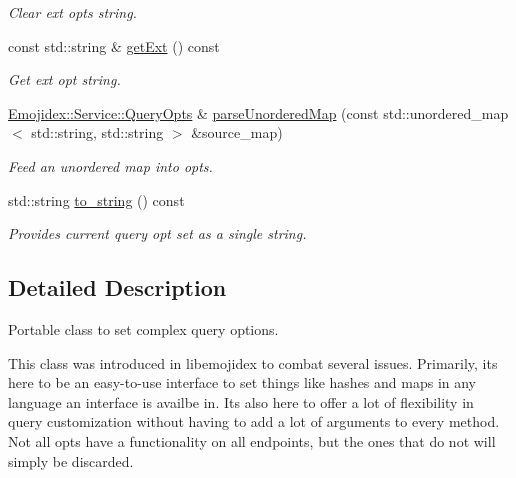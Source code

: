 \begin{DoxyCompactItemize}
\begin{DoxyCompactList}\small\item\em Clear ext opts string. \end{DoxyCompactList}\item 
const std\+::string \& \hyperlink{classEmojidex_1_1Service_1_1QueryOpts_ae1904d52159992a8bc6b50eefe2f27c6}{get\+Ext} () const \hypertarget{classEmojidex_1_1Service_1_1QueryOpts_ae1904d52159992a8bc6b50eefe2f27c6}{}\label{classEmojidex_1_1Service_1_1QueryOpts_ae1904d52159992a8bc6b50eefe2f27c6}

\begin{DoxyCompactList}\small\item\em Get ext opt string. \end{DoxyCompactList}\item 
\hyperlink{classEmojidex_1_1Service_1_1QueryOpts}{Emojidex\+::\+Service\+::\+Query\+Opts} \& \hyperlink{classEmojidex_1_1Service_1_1QueryOpts_afeace74ce515ca48c21c01fae5c01838}{parse\+Unordered\+Map} (const std\+::unordered\+\_\+map$<$ std\+::string, std\+::string $>$ \&source\+\_\+map)\hypertarget{classEmojidex_1_1Service_1_1QueryOpts_afeace74ce515ca48c21c01fae5c01838}{}\label{classEmojidex_1_1Service_1_1QueryOpts_afeace74ce515ca48c21c01fae5c01838}

\begin{DoxyCompactList}\small\item\em Feed an unordered map into opts. \end{DoxyCompactList}\item 
std\+::string \hyperlink{classEmojidex_1_1Service_1_1QueryOpts_a8a513409a7f1c5509bd393bb2bd28225}{to\+\_\+string} () const \hypertarget{classEmojidex_1_1Service_1_1QueryOpts_a8a513409a7f1c5509bd393bb2bd28225}{}\label{classEmojidex_1_1Service_1_1QueryOpts_a8a513409a7f1c5509bd393bb2bd28225}

\begin{DoxyCompactList}\small\item\em Provides current query opt set as a single string. \end{DoxyCompactList}\end{DoxyCompactItemize}


\subsection{Detailed Description}
Portable class to set complex query options. 

This class was introduced in libemojidex to combat several issues. Primarily, it\textquotesingle{}s here to be an easy-\/to-\/use interface to set things like hashes and maps in any language an interface is availbe in. It\textquotesingle{}s also here to offer a lot of flexibility in query customization without having to add a lot of arguments to every method. Not all opts have a functionality on all endpoints, but the ones that do not will simply be discarded.

